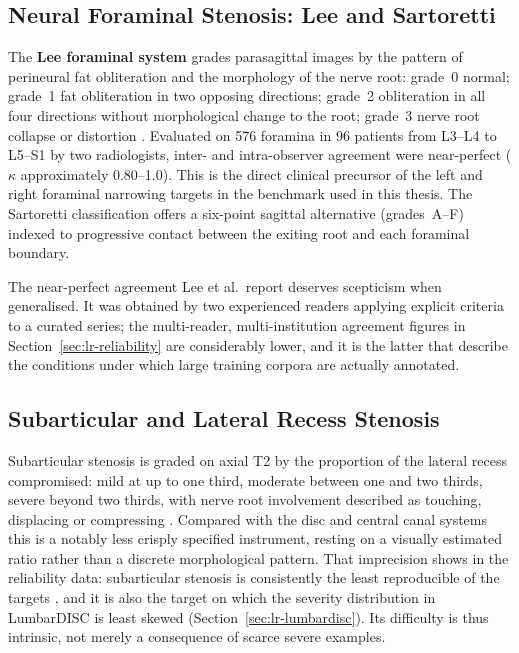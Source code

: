 \subsection{Neural Foraminal Stenosis: Lee and Sartoretti}
\label{sec:lr-foraminal-grading}

The \textbf{Lee foraminal system} grades parasagittal images by the pattern of
perineural fat obliteration and the morphology of the nerve root: grade~0
normal; grade~1 fat obliteration in two opposing directions; grade~2
obliteration in all four directions without morphological change to the root;
grade~3 nerve root collapse or distortion \cite{lee2010a}. Evaluated on 576
foramina in 96 patients from L3--L4 to L5--S1 by two radiologists, inter- and
intra-observer agreement were near-perfect ($\kappa$ approximately 0.80--1.0).
This is the direct clinical precursor of the left and right foraminal narrowing
targets in the benchmark used in this thesis. The Sartoretti classification
offers a six-point sagittal alternative (grades~A--F) indexed to progressive
contact between the exiting root and each foraminal boundary.

The near-perfect agreement Lee et al.\ report deserves scepticism when
generalised. It was obtained by two experienced readers applying explicit
criteria to a curated series; the multi-reader, multi-institution agreement
figures in Section~\ref{sec:lr-reliability} are considerably lower, and it is
the latter that describe the conditions under which large training corpora are
actually annotated.

\subsection{Subarticular and Lateral Recess Stenosis}
\label{sec:lr-subarticular-grading}

Subarticular stenosis is graded on axial T2 by the proportion of the lateral
recess compromised: mild at up to one third, moderate between one and two
thirds, severe beyond two thirds, with nerve root involvement described as
touching, displacing or compressing \cite{lurie2008reliability,andreisek2014consensus}.
Compared with the disc and central canal systems this is a notably less
crisply specified instrument, resting on a visually estimated ratio rather than
a discrete morphological pattern. That imprecision shows in the reliability
data: subarticular stenosis is consistently the least reproducible of the
targets \cite{lurie2008reliability}, and it is also the target on which the
severity distribution in LumbarDISC is least skewed
(Section~\ref{sec:lr-lumbardisc}). Its difficulty is thus intrinsic, not merely
a consequence of scarce severe examples.

